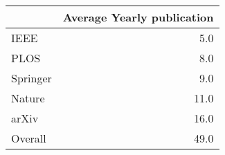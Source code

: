 \begin{tabular}{lr}
\toprule
{} &  Average Yearly publication \\
\midrule
IEEE     &                         5.0 \\
PLOS     &                         8.0 \\
Springer &                         9.0 \\
Nature   &                        11.0 \\
arXiv    &                        16.0 \\
Overall  &                        49.0 \\
\bottomrule
\end{tabular}
